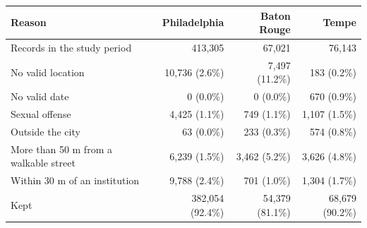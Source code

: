 \begin{tabular}{lrrr}
\toprule
Reason & Philadelphia & Baton Rouge & Tempe \\
\midrule
Records in the study period & 413,305 & 67,021 & 76,143 \\
\midrule
No valid location & 10,736 (2.6\%) & 7,497 (11.2\%) & 183 (0.2\%) \\
No valid date & 0 (0.0\%) & 0 (0.0\%) & 670 (0.9\%) \\
Sexual offense & 4,425 (1.1\%) & 749 (1.1\%) & 1,107 (1.5\%) \\
Outside the city & 63 (0.0\%) & 233 (0.3\%) & 574 (0.8\%) \\
More than 50 m from a walkable street & 6,239 (1.5\%) & 3,462 (5.2\%) & 3,626 (4.8\%) \\
Within 30 m of an institution & 9,788 (2.4\%) & 701 (1.0\%) & 1,304 (1.7\%) \\
\midrule
Kept & 382,054 (92.4\%) & 54,379 (81.1\%) & 68,679 (90.2\%) \\
\bottomrule
\end{tabular}
